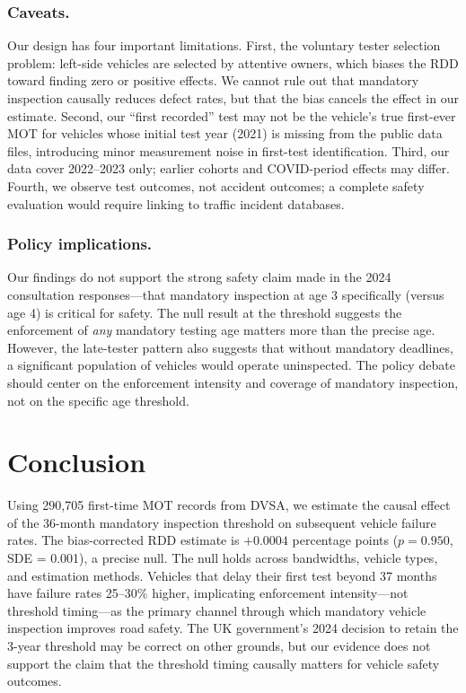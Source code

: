 \documentclass[12pt]{article}
\begin{document}
\subsubsection*{Caveats.}
Our design has four important limitations. First, the voluntary tester selection problem: left-side vehicles are selected by attentive owners, which biases the RDD toward finding zero or positive effects. We cannot rule out that mandatory inspection causally reduces defect rates, but that the bias cancels the effect in our estimate. Second, our ``first recorded'' test may not be the vehicle's true first-ever MOT for vehicles whose initial test year (2021) is missing from the public data files, introducing minor measurement noise in first-test identification. Third, our data cover 2022--2023 only; earlier cohorts and COVID-period effects may differ. Fourth, we observe test outcomes, not accident outcomes; a complete safety evaluation would require linking to traffic incident databases.

\subsubsection*{Policy implications.}
Our findings do not support the strong safety claim made in the 2024 consultation responses---that mandatory inspection at age 3 specifically (versus age 4) is critical for safety. The null result at the threshold suggests the enforcement of \emph{any} mandatory testing age matters more than the precise age. However, the late-tester pattern also suggests that without mandatory deadlines, a significant population of vehicles would operate uninspected. The policy debate should center on the enforcement intensity and coverage of mandatory inspection, not on the specific age threshold.

\section{Conclusion}

Using 290,705 first-time MOT records from DVSA, we estimate the causal effect of the 36-month mandatory inspection threshold on subsequent vehicle failure rates. The bias-corrected RDD estimate is $+0.0004$ percentage points ($p = 0.950$, SDE = 0.001), a precise null. The null holds across bandwidths, vehicle types, and estimation methods. Vehicles that delay their first test beyond 37 months have failure rates 25--30\% higher, implicating enforcement intensity---not threshold timing---as the primary channel through which mandatory vehicle inspection improves road safety. The UK government's 2024 decision to retain the 3-year threshold may be correct on other grounds, but our evidence does not support the claim that the threshold timing causally matters for vehicle safety outcomes.
\end{document}
